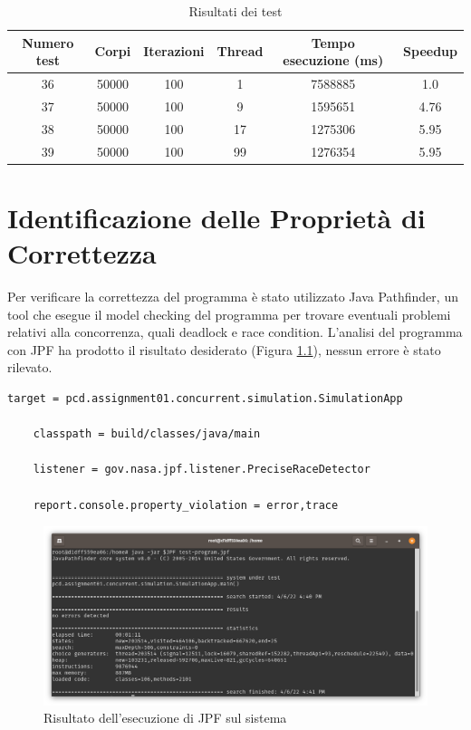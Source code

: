 \documentclass[12pt,a4paper,openright,twoside]{book}
\begin{document}
\begin{center}
	\begin{table}
		\begin{tabular}{ |c|c|c|c|c|c| } 
			\hline
				Numero test & Corpi & Iterazioni & Thread & Tempo esecuzione (ms) & Speedup \\
			\hline
		   36 & 50000 & 100 & 1 & 7588885 & 1.0 \\ 
			\hline
		   37 & 50000 & 100 & 9 & 1595651 & 4.76 \\ 
			\hline
		   38 & 50000 & 100 & 17 & 1275306 & 5.95 \\ 
			\hline
		   39 & 50000 & 100 & 99 & 1276354 & 5.95 \\ 
			\hline
		\end{tabular}
		\label{tab:table2}
		\caption{Risultati dei test}
	\end{table}
\end{center}

\chapter{Identificazione delle Proprietà di Correttezza} %
\label{chap:Identificazione delle Proprietà di Correttezza}
Per verificare la correttezza del programma è stato utilizzato Java Pathfinder, un tool che esegue il model checking del programma per trovare eventuali problemi relativi alla concorrenza, quali deadlock e race condition.
L’analisi del programma con JPF ha prodotto il risultato desiderato (Figura \ref{fig:jpf-test}), nessun errore è stato rilevato.

\begin{lstlisting}[label=lst:jpf-file,caption=file JPF]
	target = pcd.assignment01.concurrent.simulation.SimulationApp

	classpath = build/classes/java/main
	
	listener = gov.nasa.jpf.listener.PreciseRaceDetector
	
	report.console.property_violation = error,trace
\end{lstlisting}


\begin{figure}
	\centering
	\includegraphics[width=\linewidth]{figures/jpf-test.png}
	\caption{Risultato dell'esecuzione di JPF sul sistema}
	\label{fig:jpf-test}
\end{figure}
\end{document}
